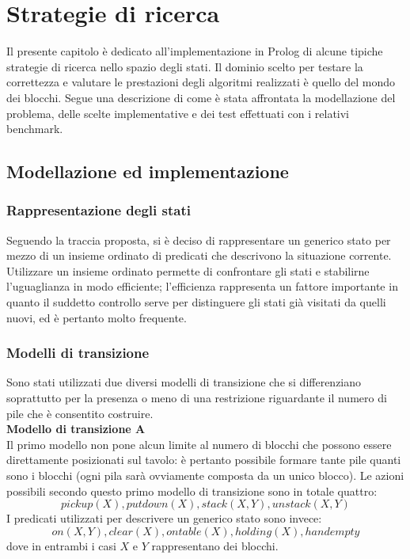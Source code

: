 \chapter{Strategie di ricerca}

Il presente capitolo è dedicato all'implementazione in Prolog di alcune tipiche strategie di ricerca nello spazio degli stati. Il dominio scelto per testare la correttezza e valutare le prestazioni degli algoritmi realizzati è quello del mondo dei blocchi. Segue una descrizione di come è stata affrontata la modellazione del problema, delle scelte implementative e dei test effettuati con i relativi benchmark.

\section{Modellazione ed implementazione}
 
\subsection{Rappresentazione degli stati}
Seguendo la traccia proposta, si è deciso di rappresentare un generico stato per mezzo di un insieme ordinato di predicati che descrivono la situazione corrente. Utilizzare un insieme ordinato permette di confrontare gli stati e stabilirne l'uguaglianza in modo efficiente; l'efficienza rappresenta un fattore importante in quanto il suddetto controllo serve per distinguere gli stati già visitati da quelli nuovi, ed è pertanto molto frequente. 

\subsection{Modelli di transizione}
Sono stati utilizzati due diversi modelli di transizione che si differenziano soprattutto per la presenza o meno di una restrizione riguardante il numero di pile che è consentito costruire.\\

\noindent\textbf{Modello di transizione A}\\
Il primo modello non pone alcun limite al numero di blocchi che possono essere direttamente posizionati sul tavolo: è pertanto possibile formare tante pile quanti sono i blocchi (ogni pila sarà ovviamente composta da un unico blocco).
Le azioni possibili secondo questo primo modello di transizione sono in totale quattro: 
\[ pickup(X), putdown(X),stack(X,Y),unstack(X,Y) \]
I predicati utilizzati per descrivere un generico stato sono invece:
\[ on(X,Y),clear(X),ontable(X),holding(X),handempty \]
dove in entrambi i casi $X$ e $Y$ rappresentano dei blocchi.\\

